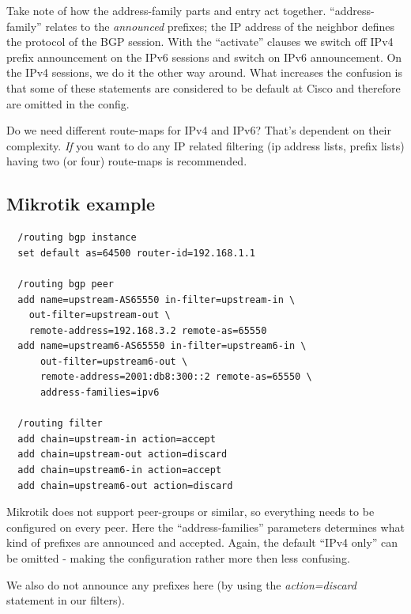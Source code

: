 Take note of how the address-family parts and entry act together. ``address-family'' relates to the \emph{announced} prefixes; the IP address of the neighbor defines the protocol of the BGP session. With the ``activate'' clauses we switch off IPv4 prefix announcement on the IPv6 sessions and switch on IPv6 announcement. On the IPv4 sessions, we do it the other way around. What increases the confusion is that some of these statements are considered to be default at Cisco and therefore are omitted in the config.

Do we need different route-maps for IPv4 and IPv6? That's dependent on their complexity. \emph{If} you want to do any IP related filtering (ip address lists, prefix lists) having two (or four) route-maps is recommended.

\subsection{Mikrotik example}
\begin{verbatim}
  /routing bgp instance
  set default as=64500 router-id=192.168.1.1

  /routing bgp peer
  add name=upstream-AS65550 in-filter=upstream-in \
    out-filter=upstream-out \
    remote-address=192.168.3.2 remote-as=65550
  add name=upstream6-AS65550 in-filter=upstream6-in \
      out-filter=upstream6-out \
      remote-address=2001:db8:300::2 remote-as=65550 \
      address-families=ipv6

  /routing filter
  add chain=upstream-in action=accept
  add chain=upstream-out action=discard
  add chain=upstream6-in action=accept
  add chain=upstream6-out action=discard
\end{verbatim}
Mikrotik does not support peer-groups or similar, so everything needs to be configured on every peer. Here the ``address-families'' parameters determines what kind of prefixes are announced and accepted. Again, the default ``IPv4 only'' can be omitted - making the configuration rather more then less confusing.

We also do not announce any prefixes here (by using the \emph{action=discard} statement in our filters).

